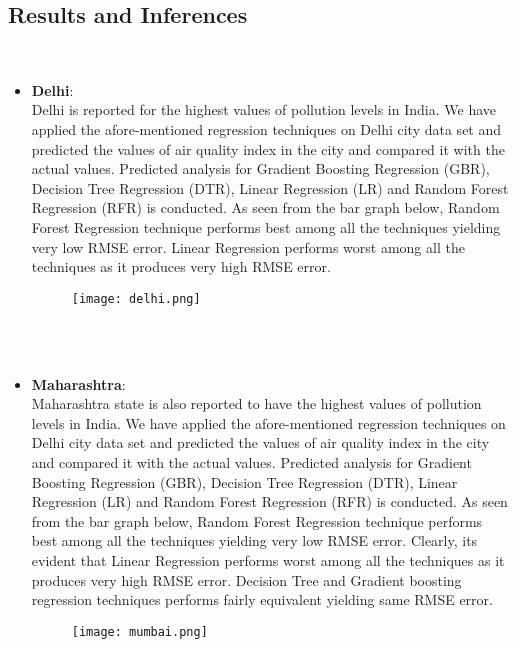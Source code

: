 \documentclass{article}
\begin{document}
\newpage
\subsection {\color{brown}
\textbf{Results and Inferences}} \\ 
\begin{itemize}
\item \textbf{Delhi}: \\
      Delhi is reported for the highest values of pollution levels in India. We have applied the afore-mentioned regression techniques on Delhi city data set and predicted the values of air quality index in the city and compared it with the actual values. Predicted analysis for Gradient Boosting Regression (GBR), Decision Tree Regression (DTR), Linear Regression (LR) and Random Forest Regression (RFR) is conducted. As seen from the bar graph below, Random Forest Regression technique performs best among all the techniques yielding very low RMSE error. Linear Regression performs worst among all the techniques as it produces very high RMSE error. \\ 
    \begin{figure}[H]
    \centering
    \texttt{[image: delhi.png]}
    \label{fig:Caption}
    \end{figure}
\\ \\
\newpage
\item \textbf{Maharashtra}:  \\ 
        Maharashtra state is also reported to have the highest values of pollution levels in India. We have applied the afore-mentioned regression techniques on Delhi city data set and predicted the values of air quality index in the city and compared it with the actual values. Predicted analysis for Gradient Boosting Regression (GBR), Decision Tree Regression (DTR), Linear Regression (LR) and Random Forest Regression (RFR) is conducted. As seen from the bar graph below, Random Forest Regression technique performs best among all the techniques yielding very low RMSE error. Clearly, its evident that Linear Regression performs worst among all the techniques as it produces very high RMSE error. Decision Tree and Gradient boosting regression techniques performs fairly equivalent yielding same RMSE error.  \\ 
     \begin{figure}[H]
\centering
    \texttt{[image: mumbai.png]}
    \label{fig:Caption}
    \end{figure}
    \newpage

\end{itemize}
\end{document}

